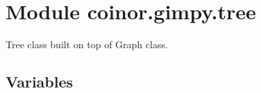 %
%
%


\section{Module coinor.gimpy.tree}

    \label{coinor:gimpy:tree}
Tree class built on top of Graph class.



  \subsection{Variables}

